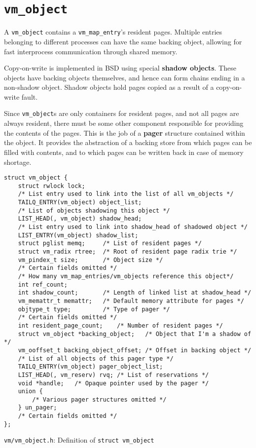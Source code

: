 \documentclass[shortabstract, english]{iithesis}
\begin{document}
\section{\texttt{vm_object}}

A \texttt{vm_object} contains a \texttt{vm_map_entry}'s resident
pages. Multiple entries belonging to different processes can have the same
backing object, allowing for fast interprocess communication through shared memory.

Copy-on-write is implemented in BSD using special \textbf{shadow objects}. These
objects have backing objects themselves, and hence can form chains ending in a
non-shadow object. Shadow objects hold pages copied as a result of a
copy-on-write fault.

Since \texttt{vm_object}s are only containers for resident pages, and not
all pages are always resident, there must be some other component responsible
for providing the contents of the pages. This is the job of a \textbf{pager}
structure contained within the object. It provides the abstraction of a backing
store from which pages can be filled with contents, and to which pages can be
written back in case of memory shortage.

\begin{listing}[H]
\begin{verbatim}
struct vm_object {
    struct rwlock lock;
    /* List entry used to link into the list of all vm_objects */
    TAILQ_ENTRY(vm_object) object_list;
    /* List of objects shadowing this object */
    LIST_HEAD(, vm_object) shadow_head;
    /* List entry used to link into shadow_head of shadowed object */
    LIST_ENTRY(vm_object) shadow_list;
    struct pglist memq;     /* List of resident pages */
    struct vm_radix rtree;  /* Root of resident page radix trie */
    vm_pindex_t size;       /* Object size */
    /* Certain fields omitted */
    /* How many vm_map_entries/vm_objects reference this object*/
    int ref_count;
    int shadow_count;       /* Length of linked list at shadow_head */
    vm_memattr_t memattr;   /* Default memory attribute for pages */
    objtype_t type;         /* Type of pager */
    /* Certain fields omitted */
    int resident_page_count;    /* Number of resident pages */
    struct vm_object *backing_object;   /* Object that I'm a shadow of */
    vm_ooffset_t backing_object_offset; /* Offset in backing object */
    /* List of all objects of this pager type */
    TAILQ_ENTRY(vm_object) pager_object_list;
    LIST_HEAD(, vm_reserv) rvq; /* List of reservations */
    void *handle;   /* Opaque pointer used by the pager */
    union {
        /* Various pager structures omitted */
    } un_pager;
    /* Certain fields omitted */
};
\end{verbatim}
\caption{\texttt{vm/vm\_object.h}: Definition of \texttt{struct vm_object}}
\end{listing}
\end{document}
